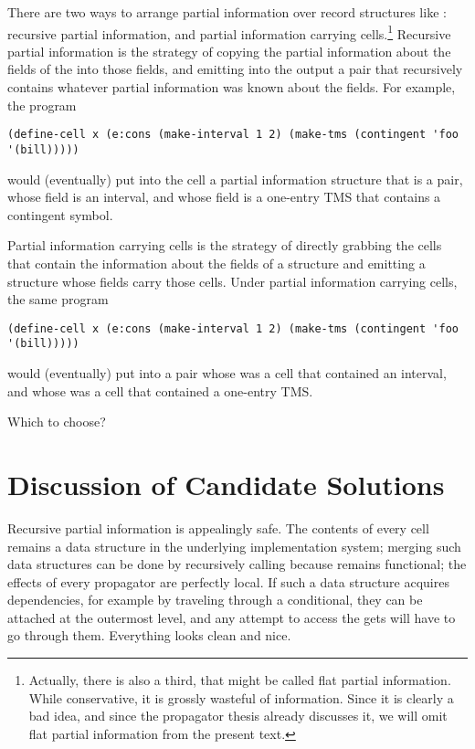 \documentclass[12pt,letterpaper]{article}
\begin{document}
There are two ways to arrange partial information over record
structures like : recursive partial information, and
partial information carrying cells.\footnote{Actually, there is also a
  third, that might be called flat partial information.  While
  conservative, it is grossly wasteful of information.  Since it is
  clearly a bad idea, and since the propagator thesis already
  discusses it, we will omit flat partial information from the present
  text.}  Recursive partial information is the strategy of copying the
partial information about the fields of the  into those
fields, and emitting into the output a pair that recursively contains
whatever partial information was known about the fields.  For example,
the program
\begin{verbatim}
(define-cell x (e:cons (make-interval 1 2) (make-tms (contingent 'foo '(bill)))))
\end{verbatim}
would (eventually) put into the cell  a partial information
structure that is a pair, whose  field is an interval, and
whose  field is a one-entry TMS that contains a contingent
symbol.

Partial information carrying cells is the strategy of directly
grabbing the cells that contain the information about the fields of a
structure and emitting a structure whose fields carry those cells.
Under partial information carrying cells, the same program
\begin{verbatim}
(define-cell x (e:cons (make-interval 1 2) (make-tms (contingent 'foo '(bill)))))
\end{verbatim}
would (eventually) put into  a pair whose  was a
cell that contained an interval, and whose  was a cell that
contained a one-entry TMS.

Which to choose?

\section{Discussion of Candidate Solutions}

Recursive partial information is appealingly safe.  The contents of
every cell remains a data structure in the underlying implementation
system; merging such data structures can be done by recursively
calling  because  remains functional; the
effects of every propagator are perfectly local.  If such a data
structure acquires dependencies, for example by traveling through a
conditional, they can be attached at the outermost level, and any
attempt to access the gets will have to go through them.  Everything
looks clean and nice.
\end{document}

